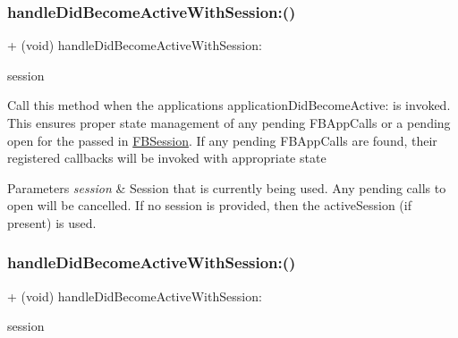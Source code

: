 \subsubsection{\texorpdfstring{handle\+Did\+Become\+Active\+With\+Session\+:()}{handleDidBecomeActiveWithSession:()}\hspace{0.1cm}{\footnotesize\ttfamily [4/5]}}
{\footnotesize\ttfamily + (void) handle\+Did\+Become\+Active\+With\+Session\+: \begin{DoxyParamCaption}\item[{(\hyperlink{interfaceFBSession}{F\+B\+Session} $\ast$)}]{session }\end{DoxyParamCaption}}

Call this method when the application\textquotesingle{}s application\+Did\+Become\+Active\+: is invoked. This ensures proper state management of any pending F\+B\+App\+Calls or a pending open for the passed in \hyperlink{interfaceFBSession}{F\+B\+Session}. If any pending F\+B\+App\+Calls are found, their registered callbacks will be invoked with appropriate state


\begin{DoxyParams}{Parameters}
{\em session} & Session that is currently being used. Any pending calls to open will be cancelled. If no session is provided, then the active\+Session (if present) is used. \\
\hline
\end{DoxyParams}
\mbox{\label{interfaceFBAppCall_aa00467d180eab724577daeeb205524a4}} 
\subsubsection{\texorpdfstring{handle\+Did\+Become\+Active\+With\+Session\+:()}{handleDidBecomeActiveWithSession:()}\hspace{0.1cm}{\footnotesize\ttfamily [5/5]}}
{\footnotesize\ttfamily + (void) handle\+Did\+Become\+Active\+With\+Session\+: \begin{DoxyParamCaption}\item[{(\hyperlink{interfaceFBSession}{F\+B\+Session} $\ast$)}]{session }\end{DoxyParamCaption}}

